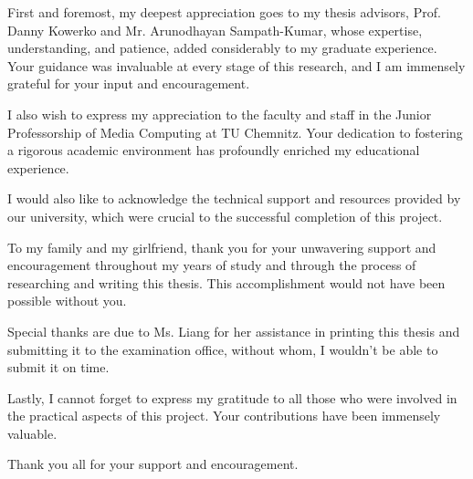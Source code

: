 First and foremost, my deepest appreciation goes to my thesis advisors, Prof. Danny Kowerko and Mr. Arunodhayan Sampath-Kumar, whose expertise, understanding, and patience, added considerably to my graduate experience. Your guidance was invaluable at every stage of this research, and I am immensely grateful for your input and encouragement.

I also wish to express my appreciation to the faculty and staff in the Junior Professorship of Media Computing at TU Chemnitz. Your dedication to fostering a rigorous academic environment has profoundly enriched my educational experience.

I would also like to acknowledge the technical support and resources provided by our university, which were crucial to the successful completion of this project.

To my family and my girlfriend, thank you for your unwavering support and encouragement throughout my years of study and through the process of researching and writing this thesis. This accomplishment would not have been possible without you.

Special thanks are due to Ms. Liang for her assistance in printing this thesis and submitting it to the examination office, without whom, I wouldn't be able to submit it on time.

Lastly, I cannot forget to express my gratitude to all those who were involved in the practical aspects of this project. Your contributions have been immensely valuable.

Thank you all for your support and encouragement.

\let\cleardoublepage\cleardoubleemptypage

